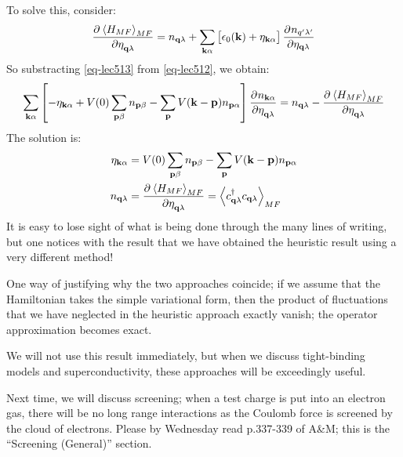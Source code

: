 To solve this, consider:
\begin{equation}\label{eq-lec513}
    \dpd{\avg{H_{MF}}_{MF}}{\eta_{\v{q}\lambda}} = n_{\v{q}\lambda} + \sum_{\v{k}\alpha}\left[\e_0(\v{k}) + \eta_{\v{k}\alpha}\right]\dpd{n_{q'\lambda'}}{{\eta_{\v{q}\lambda}}}
\end{equation}
So substracting \eqref{eq-lec513} from \eqref{eq-lec512}, we obtain:
\begin{equation}
    \sum_{\v{k}\alpha}\left[-\eta_{\v{k}\alpha} + V(0)\sum_{\v{p}\beta}n_{\v{p}\beta} - \sum_{\v{p}}V(\v{k} - \v{p})n_{\v{p}\alpha}\right]\dpd{n_{\v{k}\alpha}}{\eta_{\v{q}\lambda}} = n_{\v{q}\lambda} -  \dpd{\avg{H_{MF}}_{MF}}{\eta_{\v{q}\lambda}}
\end{equation}
The solution is:
\begin{equation}
    \begin{split}
        \eta_{\v{k}\alpha} &= V(0)\sum_{\v{p}\beta}n_{\v{p}\beta} - \sum_{\v{p}}V(\v{k} - \v{p})n_{\v{p}\alpha}
        \\ n_{\v{q}\lambda} &= \dpd{\avg{H_{MF}}_{MF}}{\eta_{\v{q}\lambda}} = \avg{c^\dag_{\v{q}\lambda}c_{\v{q}\lambda}}_{MF}
    \end{split}
\end{equation}
It is easy to lose sight of what is being done through the many lines of writing, but one notices with the result that we have obtained the heuristic result using a very different method!

One way of justifying why the two approaches coincide; if we assume that the Hamiltonian takes the simple variational form, then the product of fluctuations that we have neglected in the heuristic approach exactly vanish; the operator approximation becomes exact.

We will not use this result immediately, but when we discuss tight-binding models and superconductivity, these approaches will be exceedingly useful.

Next time, we will discuss screening; when a test charge is put into an electron gas, there will be no long range interactions as the Coulomb force is screened by the cloud of electrons. Please by Wednesday read p.337-339 of A\&M; this is the ``Screening (General)'' section.